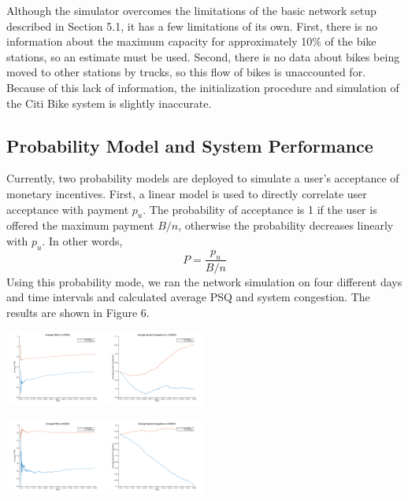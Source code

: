 \documentclass[times, 10pt,twocolumn]{article}
\begin{document}
Although the simulator overcomes the limitations of the basic network setup described in Section 5.1, it has a few limitations of its own. First, there is no information about the maximum capacity for approximately 10\% of the bike stations, so an estimate must be used. Second, there is no data about bikes being moved to other stations by trucks, so this flow of bikes is unaccounted for. Because of this lack of information, the initialization procedure and simulation of the Citi Bike system is slightly inaccurate.

\subsection{Probability Model and System Performance}
Currently, two probability models are deployed to simulate a user's acceptance of monetary incentives. First, a linear model is used to directly correlate user acceptance with payment $p_u$. The probability of acceptance is 1 if the user is offered the maximum payment $B/n$, otherwise the probability decreases linearly with $p_u$. In other words, 
\begin{equation}
P = \frac{p_u}{B/n}
\end{equation}
Using this probability mode, we ran the network simulation on four different days and time intervals and calculated average PSQ and system congestion. The results are shown in Figure 6.
\hfill \break
\centerline{\includegraphics[width=0.25\textwidth]{m4/Average_PSQ_Nov3.png}\includegraphics[width=0.25\textwidth]{m4/System_Congestion_Nov3.png}}
\centerline{\includegraphics[width=0.25\textwidth]{m4/Average_PSQ_Mar3.png}\includegraphics[width=0.25\textwidth]{m4/System_Congestion_Mar3.png}}
\end{document}
